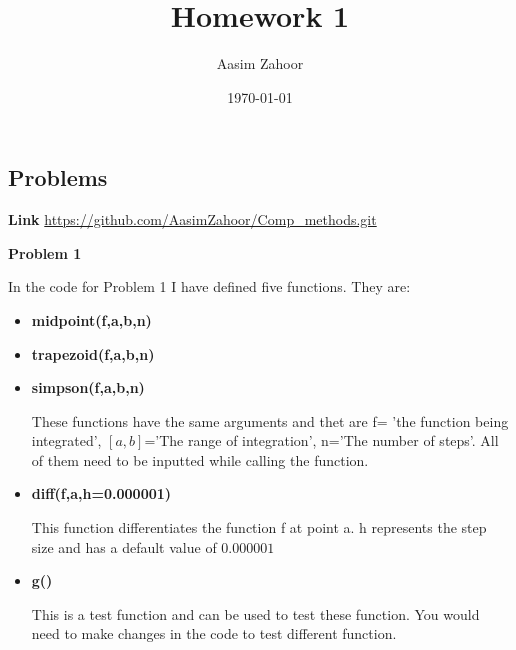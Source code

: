 \documentclass{article}
\title{Homework 1}
\author{Aasim Zahoor}
\date\today
\begin{document}
\maketitle 


\begin{center}
\section{Problems}
\end{center}
\textbf{Link}\vspace{1.5em}
\url{https://github.com/AasimZahoor/Comp_methods.git}
\vspace{1.5em}

\textbf{Problem 1}\vspace{1.5em}

In the code for Problem 1 I have defined five functions. They are:
\begin{itemize}
\item{\textbf{midpoint(f,a,b,n)}}\item{\textbf{trapezoid(f,a,b,n)}}\item{\textbf{simpson(f,a,b,n)}}\vspace{0.2em}

These functions have the same arguments and thet are f= 'the function being integrated', $[a,b]$='The range of integration', n='The number of steps'. All of them need to be inputted while calling the function.
\vspace{0.2em}

\item{\textbf{diff(f,a,h=0.000001)}}\vspace{0.2em}

This function differentiates the function f at point a. h represents the step size and has a default value of $0.000001$\vspace{0.2em}

\item{\textbf{g()}}\vspace{0.2em}

This is a test function and can be used to test these function. You would need to make changes in the code to test different function.
\vspace{0.2em}
\end{itemize}
\end{document}
